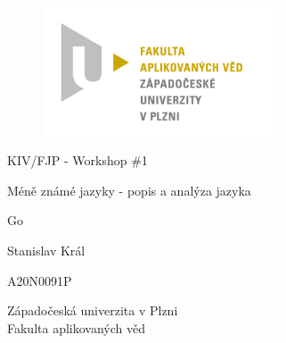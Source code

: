 \documentclass[12pt, a4paper]{article}
\begin{document}
	\renewcommand{\lstlistingname}{Ukázka kódu}
	\renewcommand{\lstlistlistingname}{Seznam ukázek kódu}
    \begin{titlepage}

       \centering

       \vspace*{\baselineskip}

       \begin{figure}[H]
          \centering
          \includegraphics[width=7cm]{img/fav-logo.jpg}
       \end{figure}

       \vspace*{1\baselineskip}
        {\sc KIV/FJP - Workshop \#1}
       \vspace*{1\baselineskip}

       \vspace{0.75\baselineskip}

       {\LARGE\sc Méně známé jazyky - popis a analýza jazyka\\}

       \vspace{0.75\baselineskip}

       {\LARGE\sc Go\\}

       \vspace{4\baselineskip}
       
		\vspace{0.5\baselineskip}

       
       {\sc\Large Stanislav Král \\}

       \vspace{0.5\baselineskip}

       {A20N0091P}

       \vfill

       {\sc Západočeská univerzita v Plzni\\
       Fakulta aplikovaných věd}


    \end{titlepage}
\end{document}
